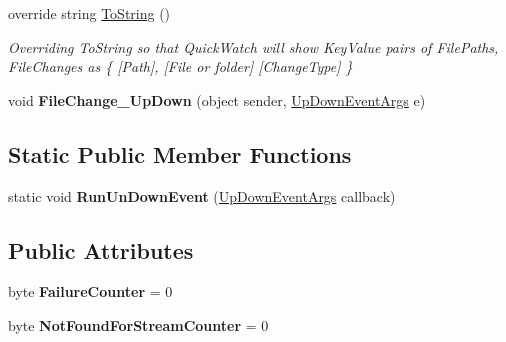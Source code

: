 \begin{DoxyCompactItemize}
override string \hyperlink{class_cloud_api_public_1_1_model_1_1_file_change_abf7bd8fb9c0b7bfcada1aa39a568a13b}{To\-String} ()
\begin{DoxyCompactList}\small\item\em Overriding To\-String so that Quick\-Watch will show Key\-Value pairs of File\-Paths, File\-Changes as \{ \mbox{[}Path\mbox{]}, \mbox{[}File or folder\mbox{]} \mbox{[}Change\-Type\mbox{]} \} \end{DoxyCompactList}\item 
\hypertarget{class_cloud_api_public_1_1_model_1_1_file_change_a4479a6e0a93d64b884fa4d48c03f6c86}{void {\bfseries File\-Change\-\_\-\-Up\-Down} (object sender, \hyperlink{class_cloud_api_public_1_1_model_1_1_file_change_1_1_up_down_event_args}{Up\-Down\-Event\-Args} e)}\label{class_cloud_api_public_1_1_model_1_1_file_change_a4479a6e0a93d64b884fa4d48c03f6c86}

\end{DoxyCompactItemize}
\subsection*{Static Public Member Functions}
\begin{DoxyCompactItemize}
\item 
\hypertarget{class_cloud_api_public_1_1_model_1_1_file_change_a43701aa92aec24c4624080d15ba1fedf}{static void {\bfseries Run\-Un\-Down\-Event} (\hyperlink{class_cloud_api_public_1_1_model_1_1_file_change_1_1_up_down_event_args}{Up\-Down\-Event\-Args} callback)}\label{class_cloud_api_public_1_1_model_1_1_file_change_a43701aa92aec24c4624080d15ba1fedf}

\end{DoxyCompactItemize}
\subsection*{Public Attributes}
\begin{DoxyCompactItemize}
\item 
\hypertarget{class_cloud_api_public_1_1_model_1_1_file_change_a731705220f8c9b1ceb3022bae1bbe02e}{byte {\bfseries Failure\-Counter} = 0}\label{class_cloud_api_public_1_1_model_1_1_file_change_a731705220f8c9b1ceb3022bae1bbe02e}

\item 
\hypertarget{class_cloud_api_public_1_1_model_1_1_file_change_a7cd99f56c8ec93e35a9dbdcce37d673a}{byte {\bfseries Not\-Found\-For\-Stream\-Counter} = 0}\label{class_cloud_api_public_1_1_model_1_1_file_change_a7cd99f56c8ec93e35a9dbdcce37d673a}

\end{DoxyCompactItemize}
